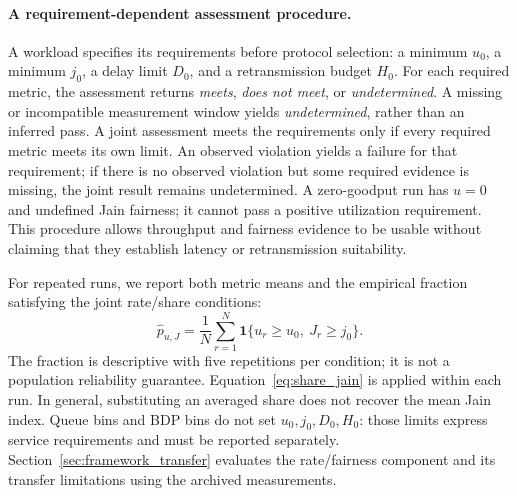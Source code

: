 \paragraph{A requirement-dependent assessment procedure.}
A workload specifies its requirements before protocol selection: a minimum
$u_0$, a minimum $j_0$, a delay limit $D_0$, and a retransmission budget
$H_0$. For each required metric, the assessment returns \emph{meets},
\emph{does not meet}, or \emph{undetermined}. A missing or incompatible
measurement window yields \emph{undetermined}, rather than an inferred pass.
A joint assessment meets the requirements only if every required metric
meets its own limit. An observed violation yields a failure for that
requirement; if there is no observed violation but some required evidence is
missing, the joint result remains undetermined. A zero-goodput run has $u=0$ and undefined Jain fairness; it cannot pass
a positive utilization requirement. This procedure allows
throughput and fairness evidence to be usable without claiming that they
establish latency or retransmission suitability.

For repeated runs, we report both metric means and the empirical fraction
satisfying the joint rate/share conditions:
\begin{equation}
 \widehat p_{u,J}=\frac{1}{N}\sum_{r=1}^{N}
 \mathbf{1}\{u_r\geq u_0,\ J_r\geq j_0\}.
 \label{eq:assessment_fraction}
\end{equation}
The fraction is descriptive with five repetitions per condition; it is not
a population reliability guarantee. Equation~\ref{eq:share_jain} is applied
within each run. In general, substituting an averaged share does not recover
the mean Jain index. Queue bins and BDP bins do not set $u_0,j_0,D_0,H_0$:
those limits express service requirements and must be reported separately.
Section~\ref{sec:framework_transfer} evaluates the rate/fairness component
and its transfer limitations using the archived measurements.
